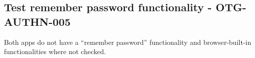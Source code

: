 \subsection{Test remember password functionality - OTG-AUTHN-005}
Both apps do not have a \enquote{remember password} functionality and browser-built-in functionalities where not checked.
\clearpage